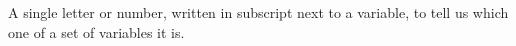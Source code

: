 A single letter or number, written in subscript next to
a variable, to tell us which one of a set of variables it
is.